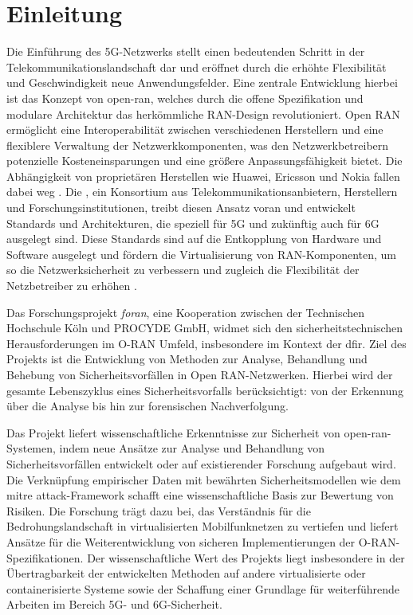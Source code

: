 \chapter{Einleitung}
\label{chap:Einleitung}

\par
Die Einführung des 5G-Netzwerks stellt einen bedeutenden Schritt in der Telekommunikationslandschaft dar und eröffnet durch die erhöhte Flexibilität und Geschwindigkeit neue Anwendungsfelder. Eine zentrale Entwicklung hierbei ist das Konzept von \gls{open-ran}, welches durch die offene Spezifikation und modulare Architektur das herkömmliche RAN-Design revolutioniert. Open RAN ermöglicht eine Interoperabilität zwischen verschiedenen Herstellern und eine flexiblere Verwaltung der Netzwerkkomponenten, was den Netzwerkbetreibern potenzielle Kosteneinsparungen und eine größere Anpassungsfähigkeit bietet. Die Abhängigkeit von proprietären Herstellen wie Huawei, Ericsson und Nokia fallen dabei weg \autocite{NokiaEricssonUnd}. Die \orana, ein Konsortium aus Telekommunikationsanbietern, Herstellern und Forschungsinstitutionen, treibt diesen Ansatz voran und entwickelt Standards und Architekturen, die speziell für 5G und zukünftig auch für 6G ausgelegt sind. Diese Standards sind auf die Entkopplung von Hardware und Software ausgelegt und fördern die Virtualisierung von RAN-Komponenten, um so die Netzwerksicherheit zu verbessern und zugleich die Flexibilität der Netzbetreiber zu erhöhen \autocite{5GFORAN}.
\par
Das Forschungsprojekt \textit{\gls{foran}}, eine Kooperation zwischen der Technischen Hochschule Köln und PROCYDE GmbH, widmet sich den sicherheitstechnischen Herausforderungen im O-RAN Umfeld, insbesondere im Kontext der \gls{dfir}. Ziel des Projekts ist die Entwicklung von Methoden zur Analyse, Behandlung und Behebung von Sicherheitsvorfällen in Open RAN-Netzwerken. Hierbei wird der gesamte Lebenszyklus eines Sicherheitsvorfalls berücksichtigt: von der Erkennung über die Analyse bis hin zur forensischen Nachverfolgung.
\par Das Projekt liefert wissenschaftliche Erkenntnisse zur Sicherheit von \gls{open-ran}-Systemen, indem neue Ansätze zur Analyse und Behandlung von Sicherheitsvorfällen entwickelt oder auf existierender Forschung aufgebaut wird. Die Verknüpfung empirischer Daten mit bewährten Sicherheitsmodellen wie dem \gls{mitre} \gls{attack}-Framework schafft eine wissenschaftliche Basis zur Bewertung von Risiken. Die Forschung trägt dazu bei, das Verständnis für die Bedrohungslandschaft in virtualisierten Mobilfunknetzen zu vertiefen und liefert Ansätze für die Weiterentwicklung von sicheren Implementierungen der O-RAN-Spezifikationen. Der wissenschaftliche Wert des Projekts liegt insbesondere in der Übertragbarkeit der entwickelten Methoden auf andere virtualisierte oder containerisierte Systeme sowie der Schaffung einer Grundlage für weiterführende Arbeiten im Bereich 5G- und 6G-Sicherheit.
